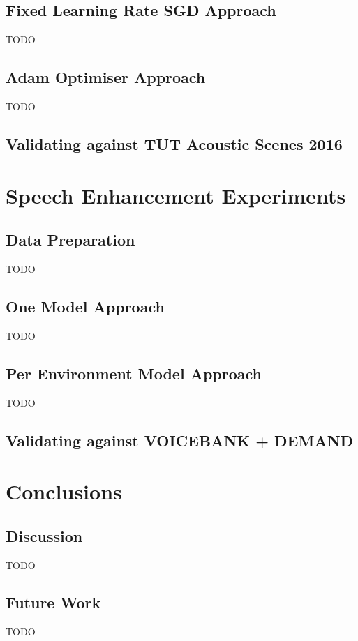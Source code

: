 \documentclass[logo,bsc,singlespacing,parskip,online]{infthesis}
\begin{document}
\section{Fixed Learning Rate SGD Approach}
TODO
\section{Adam Optimiser Approach}
TODO

\section{Validating against TUT Acoustic Scenes 2016}

\chapter{Speech Enhancement Experiments}
\section{Data Preparation}
TODO
\section{One Model Approach}
TODO
\section{Per Environment Model Approach}
TODO
\section{Validating against VOICEBANK + DEMAND}

\chapter{Conclusions}
\section{Discussion}
TODO
\section{Future Work}
TODO









\end{document}
